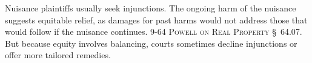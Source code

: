 Nuisance plaintiffs usually seek injunctions. The ongoing harm of the nuisance
suggests equitable relief, as damages for past harms would not address those
that would follow if the nuisance continues. 9-64 \textsc{Powell on Real
Property} \S~64.07. But because equity involves balancing, courts sometimes
decline injunctions or offer more tailored remedies. 

